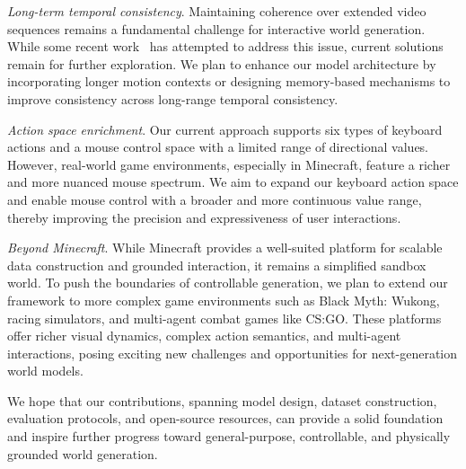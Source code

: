 \documentclass{article}
\begin{document}
\textit{Long-term temporal consistency}. Maintaining coherence over extended video sequences remains a fundamental challenge for interactive world generation. While some recent work~\cite{xiao2025worldmem,gu2025long} has attempted to address this issue, current solutions remain for further exploration. We plan to enhance our model architecture by incorporating longer motion contexts or designing memory-based mechanisms to improve consistency across long-range temporal consistency.

\textit{Action space enrichment}. Our current approach supports six types of keyboard actions and a mouse control space with a limited range of directional values. However, real-world game environments, especially in Minecraft, feature a richer and more nuanced mouse spectrum. We aim to expand our keyboard action  space and enable mouse control with a broader and more continuous value range, thereby improving the precision and expressiveness of user interactions.
 

\textit{Beyond Minecraft}. While Minecraft provides a well-suited platform for scalable data construction and grounded interaction, it remains a simplified sandbox world. To push the boundaries of controllable generation, we plan to extend our framework to more complex game environments such as Black Myth: Wukong, racing simulators, and multi-agent combat games like CS:GO. These platforms offer richer visual dynamics, complex action semantics, and multi-agent interactions, posing exciting new challenges and opportunities for next-generation world models.

We hope that our contributions, spanning model design, dataset construction, evaluation protocols, and open-source resources, can provide a solid foundation and inspire further progress toward general-purpose, controllable, and physically grounded world generation.

{ 
\small

 
}
\end{document}
